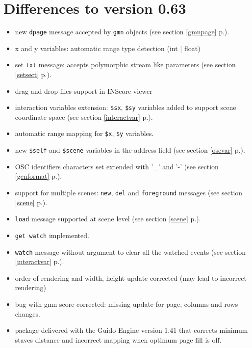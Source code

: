 \documentclass[a4paper,twoside]{report}
\newcommand{\sublevel}[1]	{\section{#1}}
\newcommand{\fullref}[1]	{\ref{#1} p.\pageref{#1}}
\newcommand{\OSC}[1]		{\texttt{#1}}
\begin{document}
\sublevel{Differences to version 0.63}
\begin{itemize}
\item new \OSC{dpage} message accepted by \OSC{gmn} objects (see section \fullref{gmnpage}).
\item x and y variables: automatic range type detection (int | float)
\item set \OSC{txt} message: accepts polymorphic stream like parameters (see section \fullref{setsect}).
\item drag and drop files support in INScore viewer
\item interaction variables extension: \OSC{\$sx}, \OSC{\$sy} variables added to support scene coordinate space (see section \fullref{interactvar}).
\item automatic range mapping for \OSC{\$x}, \OSC{\$y} variables.
\item new \OSC{\$self} and \OSC{\$scene} variables in the address field (see section \fullref{oscvar}).
\item OSC identifiers characters set extended with '\_' and '-' (see section \fullref{genformat}).
\item support for multiple scenes: \OSC{new}, \OSC{del} and \OSC{foreground} messages (see section \fullref{scene}).
\item \OSC{load} message supported at scene level (see section \fullref{scene}).
\item \OSC{get watch} implemented.
\item \OSC{watch} message without argument to clear all the watched events (see section \fullref{interactvar}).
\item order of rendering and width, height update corrected (may lead to incorrect rendering)
\item bug with gmn score corrected: missing update for page, columns and rows changes.
\item package delivered with the Guido Engine version 1.41 that corrects minimum staves distance and incorrect mapping when optimum page fill is off.
\end{itemize}
\end{document}
